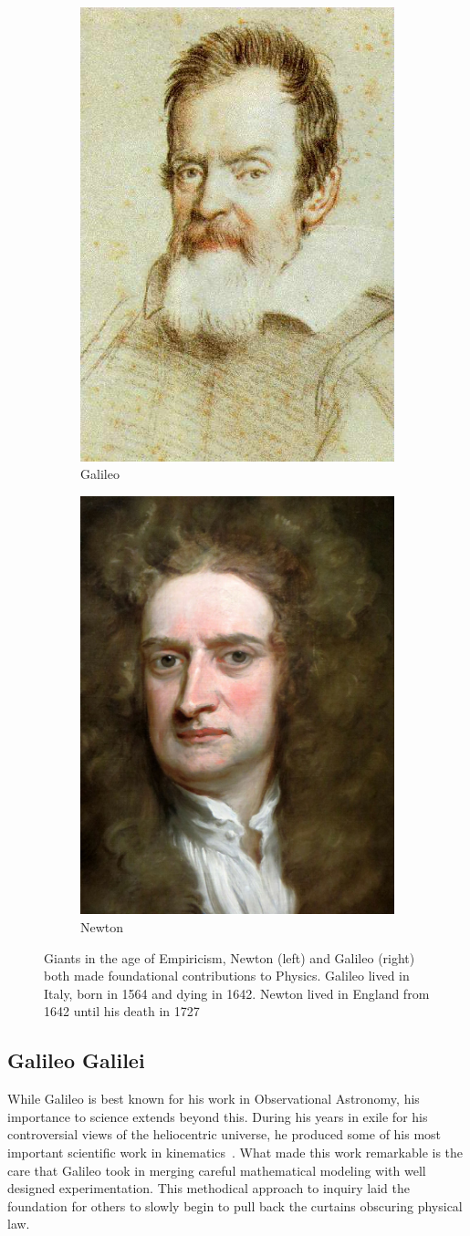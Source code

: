 \begin{figure}[ht]
	\centering
	\begin{subfigure}{.5\textwidth}
		\centering
		\includegraphics[width=0.4\linewidth]{./figures/galileo.jpg}
		\caption{Galileo \cite{Leoni1624}}
		\label{fig:galileo}
	\end{subfigure}%
	\begin{subfigure}{0.5\textwidth}
		\centering
		\includegraphics[width=0.4\linewidth]{./figures/newton.jpg}
		\caption{Newton}
		\label{fig:newton}
	\end{subfigure}
	\caption{ 
		Giants in the age of Empiricism, Newton (left) and
		Galileo (right) both made foundational contributions to Physics.
		Galileo lived in Italy, born in 1564 and dying in 1642. Newton lived in
		England from 1642 until his death in 1727
	}
	\label{fig:newtongalileo}
\end{figure}

\subsection{Galileo Galilei}
While Galileo is best known for his work in Observational Astronomy, his
importance to science extends beyond this. During his years in exile for his
controversial views of the heliocentric universe, he produced some of his most
important scientific work in kinematics~\cite{Hall1965}. What made this work
remarkable is the care that Galileo took in merging careful mathematical
modeling with well designed experimentation. This methodical approach to inquiry
laid the foundation for others to slowly begin to pull back the curtains
obscuring physical law.

